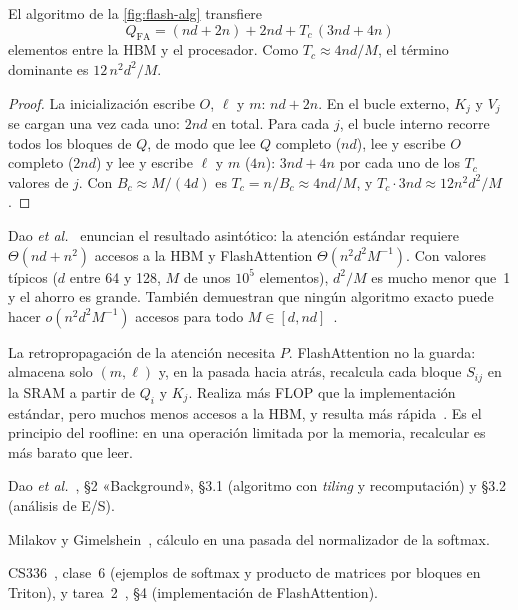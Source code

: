 \begin{proposicion}\label{prop:flash-trafico}
El algoritmo de la \cref{fig:flash-alg} transfiere
\[
Q_{\mathrm{FA}}=(nd+2n)+2nd+T_c\,(3nd+4n)
\]
elementos entre la HBM y el procesador. Como $T_c\approx 4nd/M$, el término dominante es $12\,n^{2}d^{2}/M$.
\end{proposicion}

\begin{proof}
La inicialización escribe $O$, $\ell$ y $m$: $nd+2n$. En el bucle externo, $K_j$ y $V_j$ se cargan una vez cada uno: $2nd$ en total. Para cada $j$, el bucle interno recorre todos los bloques de $Q$, de modo que lee $Q$ completo ($nd$), lee y escribe $O$ completo ($2nd$) y lee y escribe $\ell$ y $m$ ($4n$): $3nd+4n$ por cada uno de los $T_c$ valores de $j$. Con $B_c\approx M/(4d)$ es $T_c=n/B_c\approx 4nd/M$, y $T_c\cdot 3nd\approx 12n^{2}d^{2}/M$.
\end{proof}

Dao \emph{et al.}~\cite[teorema~2]{flash} enuncian el resultado asintótico: la atención estándar requiere $\Theta(nd+n^{2})$ accesos a la HBM y FlashAttention $\Theta(n^{2}d^{2}M^{-1})$. Con valores típicos ($d$ entre 64 y 128, $M$ de unos $10^{5}$ elementos), $d^{2}/M$ es mucho menor que~1 y el ahorro es grande. También demuestran que ningún algoritmo exacto puede hacer $o(n^{2}d^{2}M^{-1})$ accesos para todo $M\in[d,nd]$~\cite[proposición~3]{flash}.

\begin{observacion}
La retropropagación de la atención necesita $P$. FlashAttention no la guarda: almacena solo $(m,\ell)$ y, en la pasada hacia atrás, recalcula cada bloque $S_{ij}$ en la SRAM a partir de $Q_i$ y $K_j$. Realiza más FLOP que la implementación estándar, pero muchos menos accesos a la HBM, y resulta más rápida~\cite[§3.1]{flash}. Es el principio del roofline: en una operación limitada por la memoria, recalcular es más barato que leer.
\end{observacion}

\begin{lecturas}
\item Dao \emph{et al.}~\cite{flash}, §2 «Background», §3.1 (algoritmo con \emph{tiling} y recomputación) y §3.2 (análisis de E/S).
\item Milakov y Gimelshein~\cite{milakov}, cálculo en una pasada del normalizador de la softmax.
\item CS336~\cite{cs336}, clase~6 (ejemplos de softmax y producto de matrices por bloques en Triton), y tarea~2~\cite{cs336a2}, §4 (implementación de FlashAttention).
\end{lecturas}

